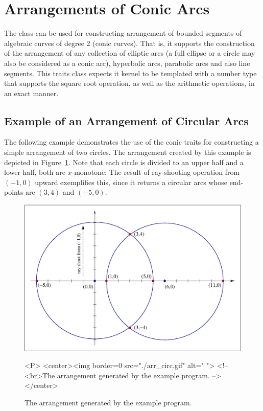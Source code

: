 
\section{Arrangements of Conic Arcs}

The  class can be used for constructing
arrangement of bounded segments of algebraic curves of degree 2 (conic 
curves). That is, it supports the construction of the arrangement of any 
collection of elliptic arcs (a full ellipse or a circle may also be considered
as a conic arc), hyperbolic arcs, parabolic arcs and also line segments.
This traits class expects it kernel to be templated with a number type
that supports the square root operation, as well as the arithmetic operations,
in an exact manner.

\subsection{Example of an Arrangement of Circular Arcs}
\label{ssec:example3}
The following example demonstrates the use of the conic traits for 
constructing a simple arrangement of two circles. The arrangement created 
by this example is depicted in Figure~\ref{fig:circles}. Note that each
circle is divided to an upper half and a lower half, both are $x$-monotone:
The result of ray-shooting operation from $(-1,0)$ upward exemplifies this, 
since it returns a circular arcs whose end-points are $(3,4)$ and $(-5,0)$.

\begin{figure}[h]
\begin{ccTexOnly}
{\centering \resizebox*{0.3\textheight}{0.5\textheight}%
{\includegraphics{arr_circ.ps}}}
\end{ccTexOnly}
\caption{The arrangement generated by the example program.\label{fig:circles}}
\begin{ccHtmlOnly}
<P>
<center><img border=0 src="./arr_circ.gif" alt=" ">
<!-- <br>The arrangement generated by the example program. -->
</center>
\end{ccHtmlOnly}
\end{figure}

